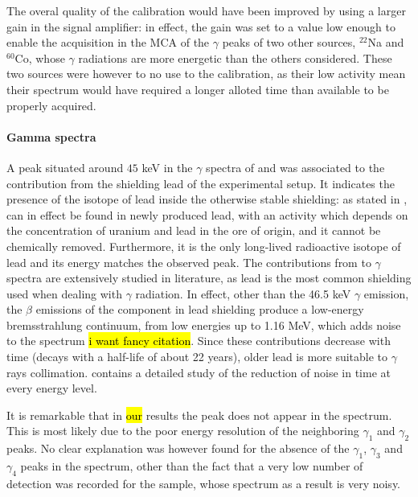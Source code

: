The overal quality of the calibration would have been improved by using a larger  gain in the signal amplifier:
in effect, the gain was set to a value low enough to enable the acquisition in the MCA of the $\gamma$ peaks of two other sources, $^{22}$Na and $^{60}$Co, whose $\gamma$ radiations are more energetic than the others considered.
These two sources were however to no use to the calibration, as their low activity mean their spectrum would have required a longer alloted time than available to be properly acquired.

\paragraph{Gamma spectra}
A peak situated around $45$ keV in the $\gamma$ spectra of \cesium and \hafnium was associated to the contribution from the shielding lead of the experimental setup.
It indicates the presence of the \lead isotope of lead inside the otherwise stable shielding:
as stated in \cite{korun_influence_2009}, \lead can in effect be found in newly produced lead, with an activity which depends on the concentration of uranium and lead in the ore of origin, and it cannot be chemically removed.
Furthermore, it is the only long-lived radioactive isotope of lead and its energy matches the observed peak.
The contributions from \lead to $\gamma$ spectra are extensively studied in literature, as lead is the most common shielding used when dealing with $\gamma$ radiation.
In effect, other than the 46.5 keV $\gamma$ emission, the $\beta$ emissions of the \lead component in lead shielding produce a low-energy bremsstrahlung
continuum, from low energies up to 1.16 MeV, which adds noise to the spectrum \cite{smith_evaluation_2008} \hl{i want fancy citation}.
Since these contributions decrease with time (\lead decays with a half-life of about 22 years), older lead is more suitable to $\gamma$ rays collimation.
\cite{korun_influence_2009} contains a detailed study of the reduction of noise in time at every energy level.

It is remarkable that in \hl{our} results the \lead peak does not appear in the \cobalt spectrum. 
This is most likely due to the poor energy resolution of the neighboring $\gamma_1$ and $\gamma_2$ peaks.
No clear explanation was however found for the absence of the $\gamma_1$, $\gamma_3$ and $\gamma_4$ peaks in the \hafnium spectrum, other than the fact that a very low number of detection was recorded for the sample, whose spectrum as a result is very noisy.

